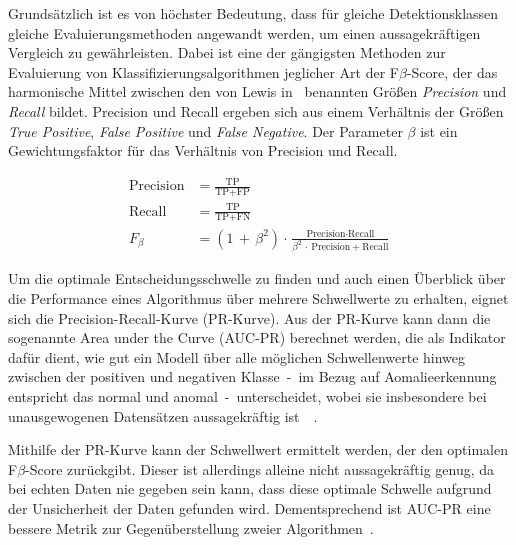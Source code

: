 Grundsätzlich ist es von höchster Bedeutung, dass für gleiche Detektionsklassen gleiche Evaluierungsmethoden angewandt werden, um einen
aussagekräftigen Vergleich zu gewährleisten. Dabei ist eine der gängigsten Methoden zur Evaluierung von Klassifizierungsalgorithmen
jeglicher Art der F$\beta$-Score, der das harmonische Mittel zwischen den von Lewis in~\cite{Lewis1991} benannten Größen \textit{Precision}
und \textit{Recall} bildet. Precision und Recall ergeben sich aus einem Verhältnis der Größen \textit{True Positive}, \textit{False
Positive} und \textit{False Negative}. Der Parameter $\beta$ ist ein Gewichtungsfaktor für das Verhältnis von Precision und Recall.

\begin{align}
    \text{Precision} &= \frac{\text{TP}}{\text{TP} + \text{FP}} \label{eq:precision} \\
    \text{Recall} &= \frac{\text{TP}}{\text{TP} + \text{FN}} \label{eq:recall} \\
    F_{\beta} &= (1\,+\,\beta^2) \cdot \frac{\text{Precision} \cdot \text{Recall}}{\beta^2\,\cdot\,\text{Precision} + \text{Recall}}
    \label{eq:fbeta}
\end{align}

Um die optimale Entscheidungsschwelle zu finden und auch einen Überblick über die Performance eines Algorithmus über mehrere Schwellwerte
zu erhalten, eignet sich die Precision-Recall-Kurve (PR-Kurve). Aus der PR-Kurve kann dann die sogenannte Area under the Curve (AUC-PR)
berechnet werden, die als Indikator dafür dient, wie gut ein Modell über alle möglichen Schwellenwerte hinweg zwischen der positiven und
negativen Klasse~-~im Bezug auf Aomalieerkennung entspricht das normal und anomal~-~unterscheidet, wobei sie insbesondere bei
unausgewogenen Datensätzen aussagekräftig ist~\cite{Davis2006}~\cite{Schmidl2022}.

Mithilfe der PR-Kurve kann der Schwellwert ermittelt werden, der den optimalen F$\beta$-Score zurückgibt. Dieser ist allerdings
alleine nicht aussagekräftig genug, da bei echten Daten nie gegeben sein kann, dass diese optimale Schwelle aufgrund der Unsicherheit der
Daten gefunden wird. Dementsprechend ist AUC-PR eine bessere Metrik zur Gegenüberstellung zweier Algorithmen~\cite{Japkowicz2002}.
